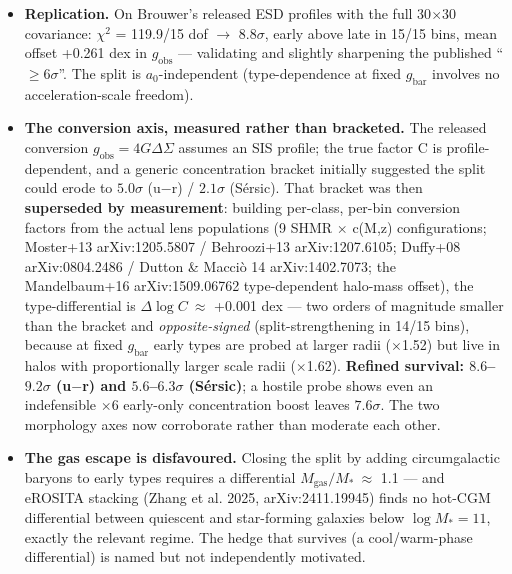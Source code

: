 \documentclass[11pt,a4paper]{article}
\begin{document}
\begin{itemize}
\item \textbf{Replication.} On Brouwer's released ESD profiles with the full 30$\times$30 covariance: $\chi^{2}$ = 119.9/15 dof $\to$ \textbf{$8.8\sigma$}, early above late in 15/15 bins, mean offset +0.261 dex in $g_{\mathrm{obs}}$ --- validating and slightly sharpening the published ``$\ge{}6\sigma$''. The split is $a_{0}$-independent (type-dependence at fixed $g_{\mathrm{bar}}$ involves no acceleration-scale freedom).

\item \textbf{The conversion axis, measured rather than bracketed.} The released conversion $g_{\mathrm{obs}} = 4G\Delta\Sigma$ assumes an SIS profile; the true factor C is profile-dependent, and a generic concentration bracket initially suggested the split could erode to $5.0\sigma$ (u$-$r) / $2.1\sigma$ (S\'ersic). That bracket was then \textbf{superseded by measurement}: building per-class, per-bin conversion factors from the actual lens populations (9 SHMR $\times$ c(M,z) configurations; Moster+13 arXiv:1205.5807 / Behroozi+13 arXiv:1207.6105; Duffy+08 arXiv:0804.2486 / Dutton \& Macci\`o 14 arXiv:1402.7073; the Mandelbaum+16 arXiv:1509.06762 type-dependent halo-mass offset), the type-differential is $\Delta\log C\ \approx$ +0.001 dex --- two orders of magnitude smaller than the bracket and \emph{opposite-signed} (split-strengthening in 14/15 bins), because at fixed $g_{\mathrm{bar}}$ early types are probed at larger radii ($\times$1.52) but live in halos with proportionally larger scale radii ($\times$1.62). \textbf{Refined survival: $8.6$--$9.2\sigma$ (u$-$r) and $5.6$--$6.3\sigma$ (S\'ersic)}; a hostile probe shows even an indefensible $\times$6 early-only concentration boost leaves $7.6\sigma$. The two morphology axes now corroborate rather than moderate each other.

\item \textbf{The gas escape is disfavoured.} Closing the split by adding circumgalactic baryons to early types requires a differential $M_{\mathrm{gas}}/M_\ast\ \approx$ 1.1 --- and eROSITA stacking (Zhang et al. 2025, arXiv:2411.19945) finds no hot-CGM differential between quiescent and star-forming galaxies below $\log M_\ast = 11$, exactly the relevant regime. The hedge that survives (a cool/warm-phase differential) is named but not independently motivated.


\end{itemize}
\end{document}
